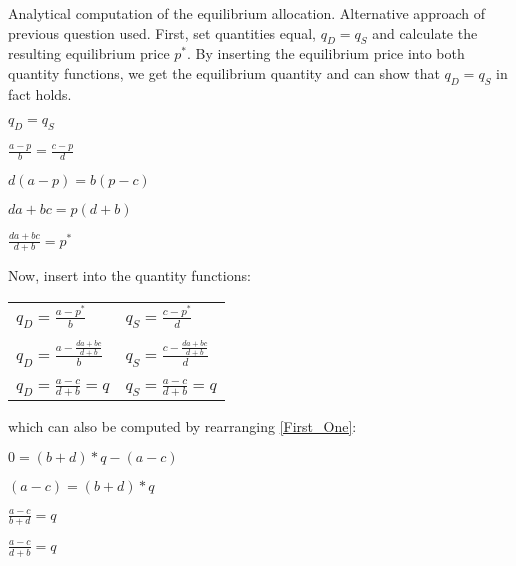 \documentclass{article}
\begin{document}
Analytical computation of the equilibrium allocation. Alternative approach of previous question used. First, set quantities equal, $q_D = q_S$ and calculate the resulting equilibrium price $p^{*}$. By inserting the equilibrium price into both quantity functions, we get the equilibrium quantity and can show that $q_D = q_S$ in fact holds.
\begin{center} $q_D = q_S $ \end{center}
\begin{center}$\frac{a-p}{b} = \frac{c-p}{d} $ \end{center}
\begin{center}$d(a-p) = b(p-c)$ \end{center}
\begin{center}$da+bc=p(d+b)$ \end{center}
\begin{center}$\frac{da+bc}{d+b} = p^{*}$\end{center}
Now, insert into the quantity functions:
\begin{center} \begin{tabular}{ l l }
   $q_D= \frac{a-p^{*}}{b} $ & $q_S= \frac{c-p^{*}}{d} $  \\
   & \\
   $q_D= \frac{a-\frac{da+bc}{d+b}}{b} $ & $q_S= \frac{c-\frac{da+bc}{d+b}}{d} $  \\
   & \\
   $q_D= \frac{a-c}{d+b}=q $ & $q_S= \frac{a-c}{d+b}=q $  \\ \end{tabular} \end{center}
which can also be computed by rearranging \eqref{First_One}:
\begin{center}$0 =(b+d)*q-(a-c)$ \end{center}
\begin{center}$(a-c) =(b+d)*q$ \end{center}
\begin{center}$\frac{a-c}{b+d}=q$ \end{center}
\begin{center}$\frac{a-c}{d+b}=q$\end{center}
\end{document}
